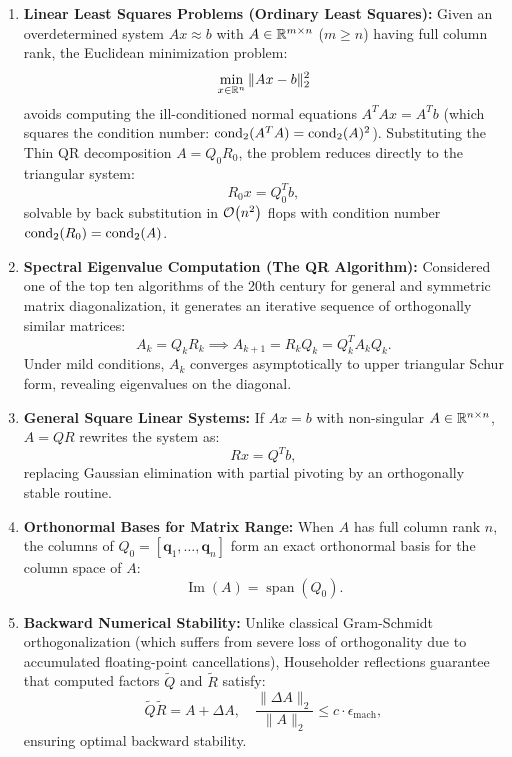 \begin{enumerate}
    \item \textbf{Linear Least Squares Problems (Ordinary Least Squares):}
    Given an overdetermined system $Ax \approx b$ with $A \in \mathbb{R}^{m \times n}$ ($m \ge n$) having full column rank, the Euclidean minimization problem:
    \begin{equation}
        \min_{x \in \mathbb{R}^n} \|Ax - b\|_2^2
    \end{equation}
    avoids computing the ill-conditioned normal equations $A^T A x = A^T b$ (which squares the condition number: $\operatorname{cond}_2(A^T A) = \operatorname{cond}_2(A)^2$). Substituting the Thin QR decomposition $A = Q_0 R_0$, the problem reduces directly to the triangular system:
    \begin{equation}
        R_0 x = Q_0^T b,
    \end{equation}
    solvable by back substitution in $\mathcal{O}\!\left(n^2\right)$ flops with condition number $\operatorname{cond}_2(R_0) = \operatorname{cond}_2(A)$.
    
    \item \textbf{Spectral Eigenvalue Computation (The QR Algorithm):}
    Considered one of the top ten algorithms of the 20th century for general and symmetric matrix diagonalization, it generates an iterative sequence of orthogonally similar matrices:
    \begin{equation}
        A_k = Q_k R_k \implies A_{k+1} = R_k Q_k = Q_k^T A_k Q_k.
    \end{equation}
    Under mild conditions, $A_k$ converges asymptotically to upper triangular Schur form, revealing eigenvalues on the diagonal.

    \item \textbf{General Square Linear Systems:}
    If $Ax = b$ with non-singular $A \in \mathbb{R}^{n \times n}$, $A = QR$ rewrites the system as:
    \begin{equation}
        R x = Q^T b,
    \end{equation}
    replacing Gaussian elimination with partial pivoting by an orthogonally stable routine.

    \item \textbf{Orthonormal Bases for Matrix Range:}
    When $A$ has full column rank $n$, the columns of $Q_0 = [\mathbf{q}_1, \dots, \mathbf{q}_n]$ form an exact orthonormal basis for the column space of $A$:
    \begin{equation}
        \operatorname{Im}(A) = \operatorname{span}(Q_0).
    \end{equation}

    \item \textbf{Backward Numerical Stability:}
    Unlike classical Gram-Schmidt orthogonalization (which suffers from severe loss of orthogonality due to accumulated floating-point cancellations), Householder reflections guarantee that computed factors $\tilde{Q}$ and $\tilde{R}$ satisfy:
    \begin{equation}
        \tilde{Q} \tilde{R} = A + \Delta A, \quad \frac{\|\Delta A\|_2}{\|A\|_2} \le c \cdot \epsilon_{\text{mach}},
    \end{equation}
    ensuring optimal backward stability.
\end{enumerate}

